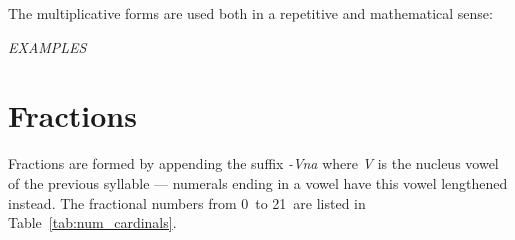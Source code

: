 \documentclass[grammar]{subfiles}
\begin{document}
	\begin{table}[htpb]\small\capstart
		\begin{center}
			\qquad
			\caption{Multiplicative numerals from 0\dec\ to 21\dec\label{tab:num_multiplicatives}}
		\end{center}
	\end{table}

	The multiplicative forms are used both in a repetitive and mathematical sense:

	\begin{exe}
		\ex \emph{EXAMPLES}
	\end{exe}

	\section{Fractions}
	\label{sec:num_fractions}

	Fractions are formed by appending the suffix \textit{-Vna} where \textit{V} is the nucleus vowel of the previous syllable — numerals ending in a vowel have this vowel lengthened instead. The fractional numbers from 0\dec\ to 21\dec\ are listed in Table~\ref{tab:num_cardinals}.
	
\end{document}
